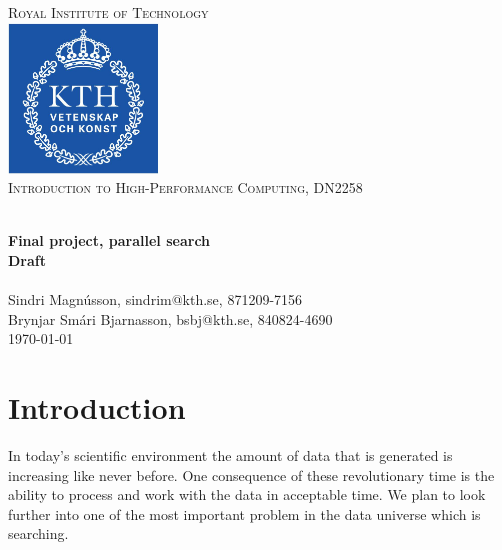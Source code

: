 \documentclass[a4paper,10pt]{article}
\title{}
\author{}
\begin{document}
\begin{titlepage}
\begin{center}


\textsc{\LARGE Royal Institute of Technology}\\[1.5cm]

\includegraphics[width=0.3\textwidth]{kth_mathematics_rgb.jpg}\\[1cm]

\textsc{\Large Introduction to High-Performance Computing, DN2258 }  %

\hrulefill \\[0.4cm]
{ \huge \bfseries Final project, parallel search\\ Draft}\\[0.4cm]
\hrulefill \\[1.5cm]


Sindri Magnússon, sindrim@kth.se, 871209-7156 \\
Brynjar Smári Bjarnasson, bsbj@kth.se, 840824-4690 \\


\vfill
{\large \today}

\end{center}
\end{titlepage}


\cleardoublepage
\tableofcontents
\newpage

\section{Introduction}

In today's scientific environment the amount of data that is generated is increasing like never before.  
One consequence of these revolutionary time is the ability to process and work with the data in acceptable time.  
We plan to look further into one of the most important problem in the data universe which is searching.  
\end{document}
